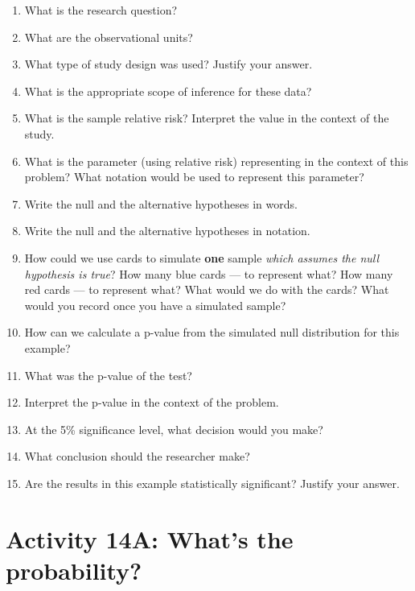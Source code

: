 \documentclass[
]{report}
\newcommand{\rgs}{\vspace{12pt}} %
\begin{document}
\begin{enumerate}
\def\labelenumi{\arabic{enumi}.}
\item
  What is the research question?
  \rgs
\item
  What are the observational units?
  \rgs
\item
  What type of study design was used? Justify your answer.
  \rgs
\item
  What is the appropriate scope of inference for these data?
  \rgs
\item
  What is the sample relative risk? Interpret the value in the context of the study.
  \rgs
  \rgs
\item
  What is the parameter (using relative risk) representing in the context of this problem? What notation would be used to represent this parameter?
  \rgs
  \rgs
\item
  Write the null and the alternative hypotheses in words.
  \rgs
  \rgs
\item
  Write the null and the alternative hypotheses in notation.
  \rgs
\item
  How could we use cards to simulate \textbf{one} sample \emph{which assumes the null hypothesis is true}? How many blue cards --- to represent what? How many red cards --- to represent what? What would we do with the cards? What would you record once you have a simulated sample?
  \rgs
  \rgs
  \rgs
\item
  How can we calculate a p-value from the simulated null distribution for this example?
  \rgs
  \rgs
\item
  What was the p-value of the test?
  \rgs
\item
  Interpret the p-value in the context of the problem.
  \rgs
  \rgs
\item
  At the 5\% significance level, what decision would you make?
  \rgs
\item
  What conclusion should the researcher make?
  \rgs
  \rgs
\item
  Are the results in this example statistically significant? Justify your answer.
  \rgs
\end{enumerate}

\newpage

\hypertarget{activity-14a-whats-the-probability}{%
\section{Activity 14A: What's the probability?}\label{activity-14a-whats-the-probability}}
\end{document}
